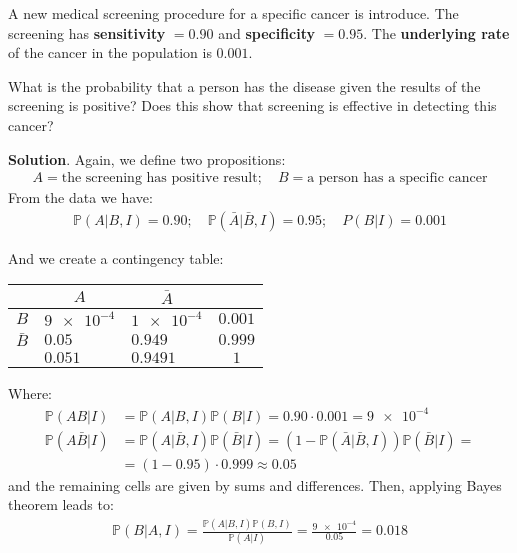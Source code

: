 \documentclass[../template.tex]{subfiles}
\begin{document}
\begin{exo}
    A new medical screening procedure for a specific cancer is introduce. The screening has \textbf{sensitivity} $=0.90$ and \textbf{specificity} $=0.95$. The \textbf{underlying rate} of the cancer in the population is $0.001$.
    
    What is the probability that a person has the disease given the results of the screening is positive? Does this show that screening is effective in detecting this cancer?

    \medskip

    \textbf{Solution}. Again, we define two propositions:
    \begin{align*}
        A = \text{the screening has positive result}; \quad B = \text{a person has a specific cancer}
    \end{align*} 
    From the data we have:
    \begin{align*}
        \mathbb{P}(A|B,I) = 0.90; \quad \mathbb{P}(\bar{A}|\bar{B},I) = 0.95; \quad P(B|I) = 0.001
    \end{align*}

    And we create a contingency table:
    \begin{table}[H]
        \centering
        \begin{tabular}{@{}r|ll|c@{}}
        \multicolumn{1}{c|}{} & \multicolumn{1}{c}{$A$}    & \multicolumn{1}{c|}{$\bar{A}$} & \multicolumn{1}{c}{}       \\ \midrule
        $B$                   & ${\num{9e-4}}$           & $\num{1e-4}$       & $0.001$ \\
        $\bar{B}$             & $0.05$ & $0.949$ & $0.999$ \\ \midrule
        \multicolumn{1}{l|}{} & $0.051$ & $0.9491$ & $1$      
        \end{tabular}
    \end{table}
    Where:
    \begin{align*}
        \mathbb{P}(AB|I) &= \mathbb{P}(A|B,I) \mathbb{P}(B|I)=0.90 \cdot 0.001 = \num{9e-4}\\
        \mathbb{P}(A\bar{B}|I) &= \mathbb{P}(A|\bar{B},I) \mathbb{P}(\bar{B}|I) = (1-\mathbb{P}(\bar{A}|\bar{B},I)) \mathbb{P}(\bar{B}|I) =\\
        &=(1-0.95)\cdot 0.999 \approx 0.05
    \end{align*}
    and the remaining cells are given by sums and differences. Then, applying Bayes theorem leads to:
    \begin{align*}
        \mathbb{P}(B|A,I) = \frac{\mathbb{P}(A|B,I) \mathbb{P}(B,I)}{\mathbb{P}(A|I)}  = \frac{\num{9e-4}}{0.05} = 0.018 
    \end{align*}
    
\end{exo}
\end{document}
